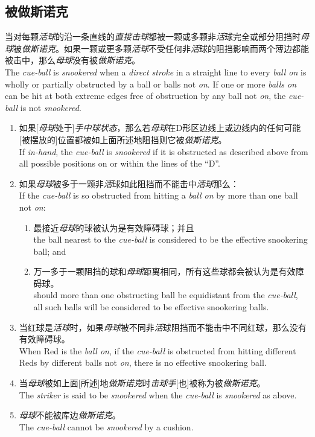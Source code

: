 \subsection{被做斯诺克}\label{22217}

\noindent 当对每颗\textit{活球}的沿一条直线的\textit{直接击球}都被一颗或多颗非\textit{活}球完全或部分阻挡时\textit{母球}被\textit{做斯诺克}。如果一颗或更多颗\textit{活球}不受任何非\textit{活}球的阻挡影响而两个薄边都能被击中，那么\textit{母球}没有被\textit{做斯诺克}。\\
The \textit{cue-ball} is \textit{snookered} when a \textit{direct stroke} in a straight line to every \textit{ball on} is wholly or partially obstructed by a ball or balls not \textit{on}. If one or more \textit{balls on} can be hit at both extreme edges free of obstruction by any ball not \textit{on}, the \textit{cue-ball} is not \textit{snookered}.
\begin{enumerate}[label=(\alph*)]
    \item 如果[\textit{母球}处于]\textit{手中球状态}，那么若\textit{母球}在D形区边线上或边线内的任何可能[被摆放的]位置都被如上面所述地阻挡则它被\textit{做斯诺克}。\\
    If \textit{in-hand}, the \textit{cue-ball} is \textit{snookered} if it is obstructed as described above from all possible positions on or within the lines of the ``D''.
    \item 如果\textit{母球}被多于一颗非\textit{活}球如此阻挡而不能击中\textit{活球}那么：\\
    If the \textit{cue-ball} is so obstructed from hitting a \textit{ball on} by more than one ball not \textit{on}:
    \begin{enumerate}[label=(\roman*)]
        \item 最接近\textit{母球}的球被认为是有效障碍球；并且\\
        the ball nearest to the \textit{cue-ball} is considered to be the effective snookering ball; and
        \item 万一多于一颗阻挡的球和\textit{母球}距离相同，所有这些球都会被认为是有效障碍球。\\
        should more than one obstructing ball be equidistant from the \textit{cue-ball}, all such balls will be considered to be effective snookering balls.
    \end{enumerate}
    \item 当红球是\textit{活球}时，如果\textit{母球}被不同非\textit{活}球阻挡而不能击中不同红球，那么没有有效障碍球。\\
    When Red is the \textit{ball on}, if the \textit{cue-ball} is obstructed from hitting different Reds by different balls not \textit{on}, there is no effective snookering ball.
    \item 当\textit{母球}被如上面[所述]地\textit{做斯诺克}时\textit{击球手}[也]被称为被\textit{做斯诺克}。\\
    The \textit{striker} is said to be \textit{snookered} when the \textit{cue-ball} is \textit{snookered} as above.
    \item \textit{母球}不能被库边\textit{做斯诺克}。\\
    The \textit{cue-ball} cannot be \textit{snookered} by a cushion.
\end{enumerate}

